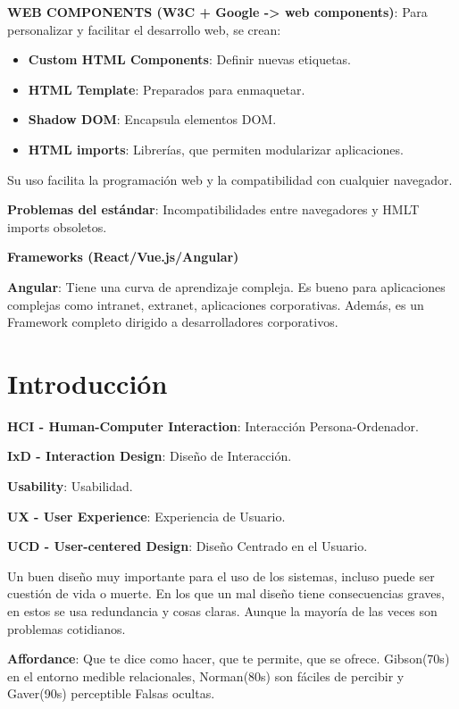\documentclass[12pt]{report} %
\begin{document}
\textbf{WEB COMPONENTS (W3C + Google -\textgreater{} web components)}: Para personalizar y facilitar el desarrollo web, se crean:

\begin{itemize}
\item
  \textbf{Custom HTML Components}: Definir nuevas etiquetas.
\item
  \textbf{HTML Template}: Preparados para enmaquetar.
\item
  \textbf{Shadow DOM}: Encapsula elementos DOM.
\item
  \textbf{HTML imports}: Librerías, que permiten modularizar
  aplicaciones.
\end{itemize}

Su uso facilita la programación web y la compatibilidad con cualquier
navegador.

\textbf{Problemas del estándar}: Incompatibilidades entre navegadores y
HMLT imports obsoletos.

\textbf{Frameworks (React/Vue.js/Angular)}

\textbf{Angular}: Tiene una curva de aprendizaje compleja. Es bueno para aplicaciones complejas como intranet, extranet, aplicaciones corporativas. Además, es un Framework completo dirigido a desarrolladores corporativos.

\chapter{Introducción}

\textbf{HCI - Human-Computer Interaction}: Interacción
Persona-Ordenador.

\textbf{IxD - Interaction Design}: Diseño de Interacción.

\textbf{Usability}: Usabilidad.

\textbf{UX - User Experience}: Experiencia de Usuario.

\textbf{UCD - User-centered Design}: Diseño Centrado en el Usuario.

Un buen diseño muy importante para el uso de los sistemas, incluso puede ser cuestión de vida o muerte. En los que un mal diseño tiene consecuencias graves, en estos se usa redundancia y cosas claras. Aunque la mayoría de las veces son problemas cotidianos.

\textbf{Affordance}: Que te dice como hacer, que te permite, que se
ofrece. Gibson(70s) en el entorno medible relacionales, Norman(80s) son
fáciles de percibir y Gaver(90s) perceptible Falsas ocultas.
\end{document}
